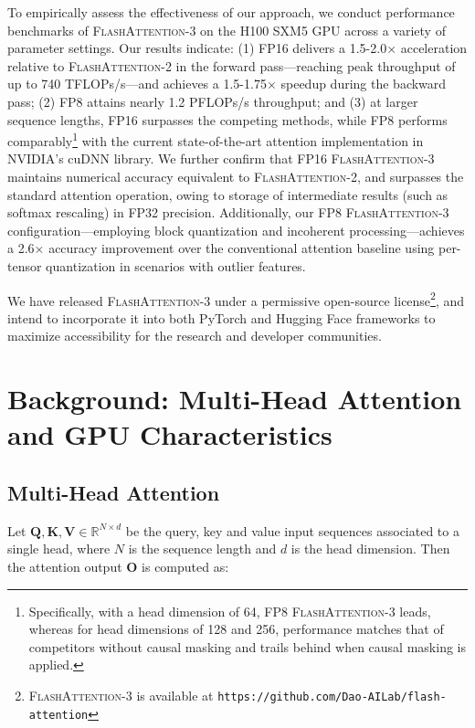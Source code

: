\begin{enumerate}
To empirically assess the effectiveness of our approach, we conduct performance benchmarks of \textsc{FlashAttention-3} on the H100 SXM5 GPU across a variety of parameter settings. Our results indicate: (1) FP16 delivers a 1.5-2.0$\times$ acceleration relative to \textsc{FlashAttention-2} in the forward pass—reaching peak throughput of up to 740 TFLOPs/s—and achieves a 1.5-1.75$\times$ speedup during the backward pass; (2) FP8 attains nearly 1.2 PFLOPs/s throughput; and (3) at larger sequence lengths, FP16 surpasses the competing methods, while FP8 performs comparably\footnote{Specifically, with a head dimension of 64, FP8 \textsc{FlashAttention-3} leads, whereas for head dimensions of 128 and 256, performance matches that of competitors without causal masking and trails behind when causal masking is applied.} with the current state-of-the-art attention implementation in NVIDIA's cuDNN library. We further confirm that FP16 \textsc{FlashAttention-3} maintains numerical accuracy equivalent to \textsc{FlashAttention-2}, and surpasses the standard attention operation, owing to storage of intermediate results (such as softmax rescaling) in FP32 precision. Additionally, our FP8 \textsc{FlashAttention-3} configuration—employing block quantization and incoherent processing—achieves a 2.6$\times$ accuracy improvement over the conventional attention baseline using per-tensor quantization in scenarios with outlier features.

We have released \textsc{FlashAttention-3} under a permissive open-source license\footnote{\textsc{FlashAttention-3}
  is available at \texttt{https://github.com/Dao-AILab/flash-attention}}, and intend to incorporate it into both PyTorch and Hugging Face frameworks to maximize accessibility for the research and developer communities.

\section{Background: Multi-Head Attention and GPU Characteristics}
\label{sec:background}

\subsection{Multi-Head Attention}
\label{subsec:multi_head_attn}

Let $\mathbf{Q}, \mathbf{K}, \mathbf{V} \in \mathbb{R}^{N \times d}$ be the query, key and value input sequences associated to a single head, where $N$ is the sequence length and $d$ is the head dimension. Then the attention output $\mathbf{O}$ is computed as:


\end{enumerate}
